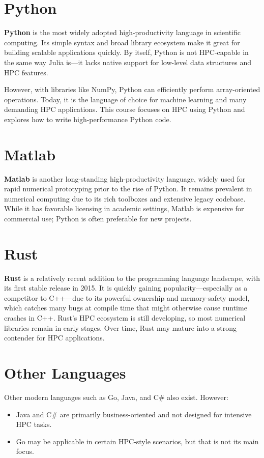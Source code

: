 \documentclass{book}
\begin{document}
\section{Python}
\textbf{Python} is the most widely adopted high-productivity language in scientific computing. Its simple syntax and broad library ecosystem make it great for building scalable applications quickly. By itself, Python is not HPC-capable in the same way Julia is—it lacks native support for low-level data structures and HPC features.

However, with libraries like NumPy, Python can efficiently perform array-oriented operations. Today, it is the language of choice for machine learning and many demanding HPC applications. This course focuses on HPC using Python and explores how to write high-performance Python code.

\section{Matlab}
\textbf{Matlab} is another long-standing high-productivity language, widely used for rapid numerical prototyping prior to the rise of Python. It remains prevalent in numerical computing due to its rich toolboxes and extensive legacy codebase. While it has favorable licensing in academic settings, Matlab is expensive for commercial use; Python is often preferable for new projects.

\section{Rust}
\textbf{Rust} is a relatively recent addition to the programming language landscape, with its first stable release in 2015. It is quickly gaining popularity—especially as a competitor to C++—due to its powerful ownership and memory-safety model, which catches many bugs at compile time that might otherwise cause runtime crashes in C++. Rust's HPC ecosystem is still developing, so most numerical libraries remain in early stages. Over time, Rust may mature into a strong contender for HPC applications.

\section{Other Languages}
Other modern languages such as Go, Java, and C\# also exist. However:
\begin{itemize}
  \item Java and C\# are primarily business-oriented and not designed for intensive HPC tasks.
  \item Go may be applicable in certain HPC-style scenarios, but that is not its main focus.
\end{itemize}
\end{document}
